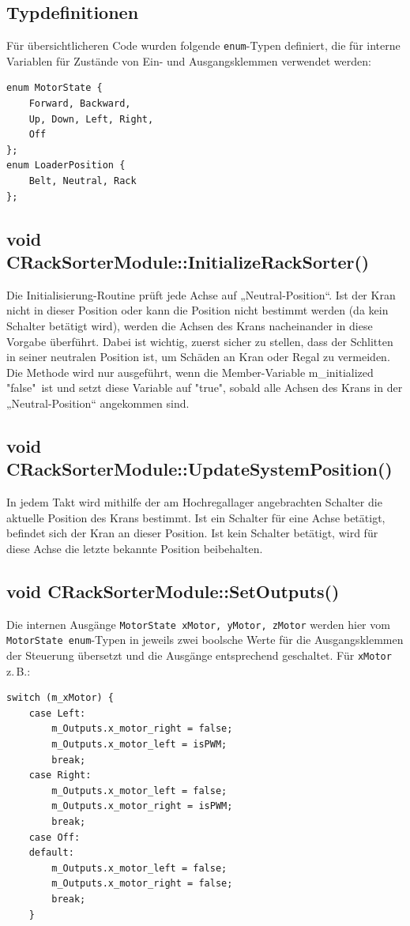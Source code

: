 \documentclass{fh-ium-bama}
\newcommand{\zb}{z.\,B.{}}
\begin{document}
\subsection{Typdefinitionen}
Für übersichtlicheren Code wurden folgende \lstinline|enum|-Typen definiert, die für interne Variablen für Zustände von Ein- und Ausgangsklemmen verwendet werden:
\begin{lstlisting}
enum MotorState {
	Forward, Backward,
	Up,	Down, Left, Right,
	Off
};
enum LoaderPosition {
	Belt, Neutral, Rack
};
\end{lstlisting}

\subsection{void CRackSorterModule::InitializeRackSorter()}
Die Initialisierung-Routine prüft jede Achse auf „Neutral-Position“. Ist der Kran nicht in dieser Position oder kann die Position nicht bestimmt werden (da kein Schalter betätigt wird), werden die Achsen des Krans nacheinander in diese Vorgabe überführt. Dabei ist wichtig, zuerst sicher zu stellen, dass der Schlitten in seiner neutralen Position ist, um Schäden an Kran oder Regal zu vermeiden.
Die Methode wird nur ausgeführt, wenn die Member-Variable m\_initialized "false"\ ist und setzt diese Variable auf "true", sobald alle Achsen des Krans in der „Neutral-Position“ angekommen sind.

\subsection{void CRackSorterModule::UpdateSystemPosition()}
In jedem Takt wird mithilfe der am Hochregallager angebrachten Schalter die aktuelle Position des Krans bestimmt. Ist ein Schalter für eine Achse betätigt, befindet sich der Kran an dieser Position. Ist kein Schalter betätigt, wird für diese Achse die letzte bekannte Position beibehalten.

\subsection{void CRackSorterModule::SetOutputs()}
Die internen Ausgänge \lstinline|MotorState xMotor, yMotor, zMotor| werden hier vom \lstinline|MotorState enum|-Typen in jeweils zwei boolsche Werte für die Ausgangsklemmen der Steuerung übersetzt und die Ausgänge entsprechend geschaltet. Für \lstinline|xMotor| \zb{}:
\begin{lstlisting}[basicstyle=\ttfamily\footnotesize]
	switch (m_xMotor) {
	case Left:
		m_Outputs.x_motor_right = false;
		m_Outputs.x_motor_left = isPWM;
		break;
	case Right:
		m_Outputs.x_motor_left = false;
		m_Outputs.x_motor_right = isPWM;
		break;
	case Off:
	default:
		m_Outputs.x_motor_left = false;
		m_Outputs.x_motor_right = false;
		break;
	}
\end{lstlisting}
\end{document}
